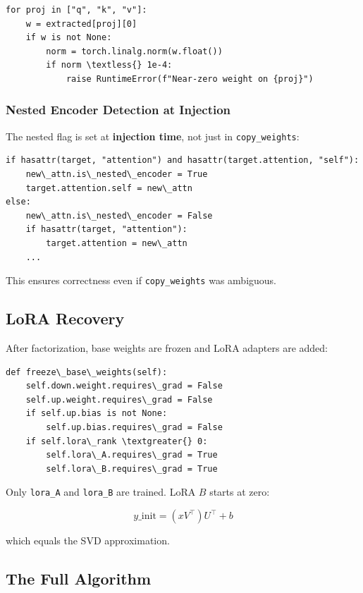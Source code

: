 \begin{lstlisting}
for proj in ["q", "k", "v"]:
    w = extracted[proj][0]
    if w is not None:
        norm = torch.linalg.norm(w.float())
        if norm \textless{} 1e-4:
            raise RuntimeError(f"Near-zero weight on {proj}")
\end{lstlisting}

\subsubsection{Nested Encoder Detection at Injection}

The nested flag is set at \textbf{injection time}, not just in \texttt{copy\_weights}:

\begin{lstlisting}
if hasattr(target, "attention") and hasattr(target.attention, "self"):
    new\_attn.is\_nested\_encoder = True
    target.attention.self = new\_attn
else:
    new\_attn.is\_nested\_encoder = False
    if hasattr(target, "attention"):
        target.attention = new\_attn
    ...
\end{lstlisting}

This ensures correctness even if \texttt{copy\_weights} was ambiguous.

\subsection{LoRA Recovery}

After factorization, base weights are frozen and LoRA adapters are added:

\begin{lstlisting}
def freeze\_base\_weights(self):
    self.down.weight.requires\_grad = False
    self.up.weight.requires\_grad = False
    if self.up.bias is not None:
        self.up.bias.requires\_grad = False
    if self.lora\_rank \textgreater{} 0:
        self.lora\_A.requires\_grad = True
        self.lora\_B.requires\_grad = True
\end{lstlisting}

Only \texttt{lora\_A} and \texttt{lora\_B} are trained. LoRA $B$ starts at zero:

\[
y\_{\text{init}} = (x V^\top) U^\top + b
\tag{4.8}
\]

which equals the SVD approximation.

\subsection{The Full Algorithm}

